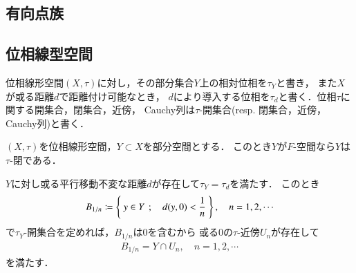 \subsection{有向点族}
\subsection{位相線型空間}
	
	位相線形空間$(X,\tau)$に対し，その部分集合$Y$上の相対位相を$\tau_Y$と書き，
	また$X$が或る距離$d$で距離付け可能なとき，
	$d$により導入する位相を$\tau_d$と書く．位相$\tau$に関する開集合，閉集合，近傍，
	Cauchy列は$\tau$-開集合(resp. 閉集合，近傍，Cauchy列)と書く．
	
	\begin{screen}
		\begin{thm}
			$(X,\tau)$を位相線形空間，$Y \subset X$を部分空間とする．
			このとき$Y$が$F$-空間なら$Y$は$\tau$-閉である．
		\end{thm}
	\end{screen}
	
	\begin{prf}
		$Y$に対し或る平行移動不変な距離$d$が存在して$\tau_Y = \tau_d$を満たす．
		このとき
		\begin{align}
			B_{1/n} \coloneqq \left\{\ y \in Y\ \, ; \quad d(y,0) < \frac{1}{n}\ \right\},
			\quad n=1,2,\cdots
		\end{align}
		で$\tau_Y$-開集合を定めれば，$B_{1/n}$は$0$を含むから
		或る0の$\tau$-近傍$U_n$が存在して
		\begin{align}
			B_{1/n} = Y \cap U_n, \quad n=1,2,\cdots
		\end{align}
		を満たす．
	\end{prf}